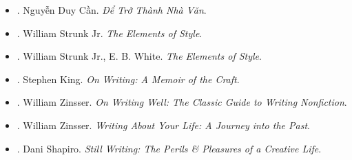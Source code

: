 \documentclass[12pt,oneside]{book}
\begin{document}
\begin{itemize}
	\item \cite{Can_nha_van}. Nguyễn Duy Cần. {\it Để Trở Thành Nhà Văn}.
	\item \cite{Strunk_element_style}. William Strunk Jr. {\it The Elements of Style}.
	\item \cite{Strunk_White_element_style}. William Strunk Jr., E. B. White. {\it The Elements of Style}.
	\item \cite{King2000,King2010}. Stephen King. {\it On Writing: A Memoir of the Craft}.
	\item \cite{Zinsser2001,Zinsser2016}. William Zinsser. {\it On Writing Well: The Classic Guide to Writing Nonfiction}.
	\item \cite{Zinsser2005}. William Zinsser. {\it Writing About Your Life: A Journey into the Past}.
	\item \cite{Shapiro2014}. Dani Shapiro. {\it Still Writing: The Perils \& Pleasures of a Creative Life}.
\end{itemize}
\end{document}
